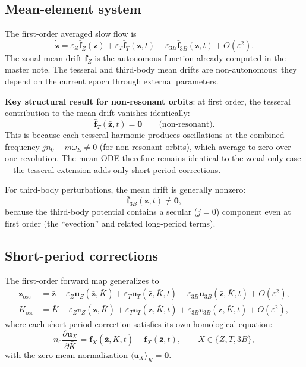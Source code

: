 \documentclass[11pt]{article}
\newcommand{\eps}{\varepsilon}
\newcommand{\mean}[1]{\langle #1 \rangle}
\begin{document}
\subsection{Mean-element system}

The first-order averaged slow flow is
\begin{equation}
\dot{\bar{\bm z}}
= \eps_Z \bar{\bm f}_Z(\bar{\bm z})
+ \eps_T \bar{\bm f}_T(\bar{\bm z}, t)
+ \eps_{3B} \bar{\bm f}_{3B}(\bar{\bm z}, t)
+ O(\eps^2).
\label{eq:mean_ode}
\end{equation}
The zonal mean drift $\bar{\bm f}_Z$ is the autonomous function already
computed in the master note. The tesseral and third-body mean drifts are
non-autonomous: they depend on the current epoch through external
parameters.

\textbf{Key structural result for non-resonant orbits}: at first order,
the tesseral contribution to the mean drift vanishes identically:
\begin{equation}
\bar{\bm f}_T(\bar{\bm z}, t) = \bm 0
\qquad \text{(non-resonant)}.
\label{eq:tesseral_mean_vanish}
\end{equation}
This is because each tesseral harmonic produces oscillations at the
combined frequency $j n_0 - m\omega_E \ne 0$ (for non-resonant orbits),
which average to zero over one revolution. The mean ODE therefore remains
identical to the zonal-only case---the tesseral extension adds only
short-period corrections.

For third-body perturbations, the mean drift is generally nonzero:
\begin{equation}
\bar{\bm f}_{3B}(\bar{\bm z}, t) \ne \bm 0,
\end{equation}
because the third-body potential contains a secular ($j = 0$) component
even at first order (the ``evection'' and related long-period terms).

\subsection{Short-period corrections}

The first-order forward map generalizes to
\begin{align}
\bm z_{\mathrm{osc}}
&= \bar{\bm z}
+ \eps_Z \bm u_Z(\bar{\bm z}, \bar K)
+ \eps_T \bm u_T(\bar{\bm z}, \bar K, t)
+ \eps_{3B} \bm u_{3B}(\bar{\bm z}, \bar K, t)
+ O(\eps^2),
\label{eq:forward_map}\\
K_{\mathrm{osc}}
&= \bar K
+ \eps_Z v_Z(\bar{\bm z}, \bar K)
+ \eps_T v_T(\bar{\bm z}, \bar K, t)
+ \eps_{3B} v_{3B}(\bar{\bm z}, \bar K, t)
+ O(\eps^2),
\end{align}
where each short-period correction satisfies its own homological equation:
\begin{equation}
n_0 \frac{\partial \bm u_X}{\partial \bar K}
= \bm f_X(\bar{\bm z}, \bar K, t)
- \bar{\bm f}_X(\bar{\bm z}, t),
\qquad X \in \{Z, T, 3B\},
\label{eq:homological}
\end{equation}
with the zero-mean normalization $\mean{\bm u_X}_K = \bm 0$.
\end{document}

